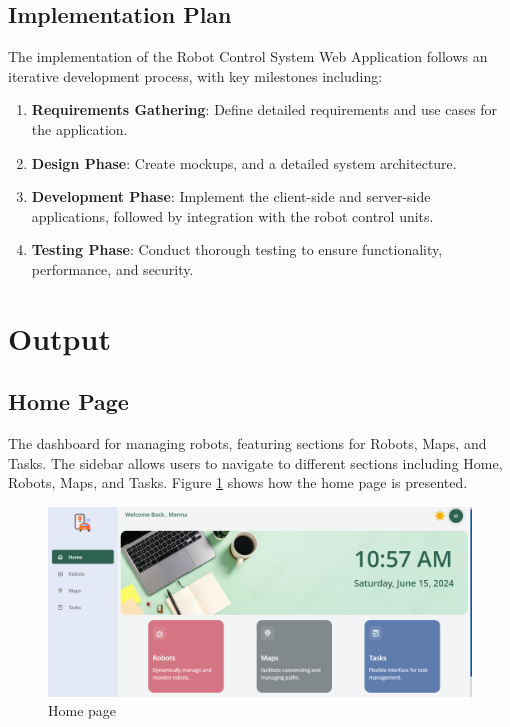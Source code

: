 \subsection{Implementation Plan}
The implementation of the Robot Control System Web Application follows an iterative development process, with key milestones including:
\begin{enumerate}
    \item \textbf{Requirements Gathering}: Define detailed requirements and use cases for the application.
    \item \textbf{Design Phase}: Create mockups, and a detailed system architecture.
    \item \textbf{Development Phase}: Implement the client-side and server-side applications, followed by integration with the robot control units.
    \item \textbf{Testing Phase}: Conduct thorough testing to ensure functionality, performance, and security.

\end{enumerate}

\newpage

\section{Output} %
\subsection{Home Page}
The dashboard for managing robots, featuring sections for Robots, Maps, and Tasks. The sidebar allows users to navigate to different sections including Home, Robots, Maps, and Tasks. Figure \ref{fig:homePage} shows how the home page is presented.

\begin{figure}[h!]
    \centering
    \includegraphics[scale=0.35]{./Figures/WebApp/HomePage.png}
    \caption{Home page}
    \label{fig:homePage}
\end{figure}

